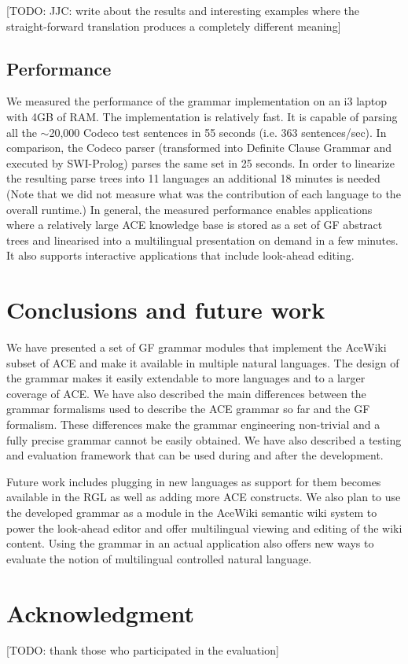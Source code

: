 \documentclass[a4paper]{article}
\begin{document}
[TODO: JJC: write about the results and
interesting examples where the straight-forward translation produces
a completely different meaning]


\subsection{Performance}

We measured the performance of the grammar implementation on an i3 laptop
with 4GB of RAM.
The implementation is relatively fast. It is capable of parsing
all the $\sim$20,000 Codeco test sentences in 55 seconds
(i.e. 363 sentences/sec). In comparison, the Codeco parser (transformed into
Definite Clause Grammar and executed by SWI-Prolog) parses
the same set in 25 seconds.
In order to linearize the
resulting parse trees into 11 languages an additional 18 minutes is needed
(Note that we did not measure what was
the contribution of each language to the overall runtime.)
In general,
the measured performance enables applications where a relatively large ACE
knowledge base is stored as a set of GF abstract trees and linearised into a
multilingual presentation on demand in a few minutes. It also supports
interactive applications that include look-ahead editing.

\section{Conclusions and future work}
\label{section:Conclusions}

We have presented a set of GF grammar modules that implement the AceWiki
subset of ACE and make it available in multiple natural languages. The design
of the grammar makes it easily extendable to more languages and to a larger
coverage of ACE.
We have also described the main differences between the grammar formalisms
used to describe the ACE grammar so far and the GF formalism.
These differences make the grammar engineering non-trivial and a fully
precise grammar cannot be easily obtained.
We have also described a testing and evaluation framework that can be used
during and after the development.

Future work includes plugging in new languages as support for them becomes
available in the RGL as well as adding more ACE constructs. We also plan
to use the developed grammar as a module in the AceWiki semantic wiki system
to power the look-ahead editor and offer multilingual viewing and editing
of the wiki content. Using the grammar in an actual application also offers
new ways to evaluate the notion of multilingual controlled natural language.

\section*{Acknowledgment}

[TODO: thank those who participated in the evaluation]



%
\end{document}
